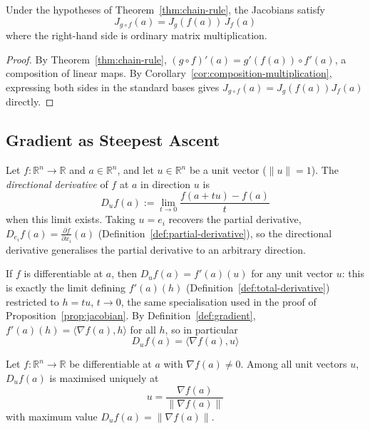 		\begin{corollary}
			\label{cor:chain-rule-matrix}
			Under the hypotheses of Theorem~\ref{thm:chain-rule}, the Jacobians satisfy
			\[
				J_{g\circ f}(a) = J_g(f(a))\, J_f(a)
			\]
			where the right-hand side is ordinary matrix multiplication.
		\end{corollary}
		
		\begin{proof}
			By Theorem~\ref{thm:chain-rule}, $(g\circ f)'(a) = g'(f(a))\circ f'(a)$, a composition of linear maps. By Corollary~\ref{cor:composition-multiplication}, expressing both sides in the standard bases gives $J_{g\circ f}(a) = J_g(f(a))J_f(a)$ directly.
		\end{proof}
		
	\subsection{Gradient as Steepest Ascent}
		
		\begin{definition}
			\label{def:directional-derivative}
			Let $f:\mathbb{R}^n\to\mathbb{R}$ and $a\in\mathbb{R}^n$, and let $u\in\mathbb{R}^n$ be a unit vector ($\|u\|=1$). The \emph{directional derivative} of $f$ at $a$ in direction $u$ is
			\[
				D_uf(a) := \lim_{t\to0} \frac{f(a+tu)-f(a)}{t}
			\]
			when this limit exists. Taking $u=e_i$ recovers the partial derivative, $D_{e_i}f(a) = \frac{\partial f}{\partial x_i}(a)$ (Definition~\ref{def:partial-derivative}), so the directional derivative generalises the partial derivative to an arbitrary direction.
		\end{definition}
		
		\begin{remark}
			\label{rem:directional-derivative-gradient}
			If $f$ is differentiable at $a$, then $D_uf(a) = f'(a)(u)$ for any unit vector $u$: this is exactly the limit defining $f'(a)(h)$ (Definition~\ref{def:total-derivative}) restricted to $h=tu$, $t\to0$, the same specialisation used in the proof of Proposition~\ref{prop:jacobian}. By Definition~\ref{def:gradient}, $f'(a)(h) = \langle \nabla f(a), h\rangle$ for all $h$, so in particular
			\[
				D_uf(a) = \langle \nabla f(a), u \rangle
			\]
		\end{remark}
		
		\begin{theorem}
			\label{thm:steepest-ascent}
			Let $f:\mathbb{R}^n\to\mathbb{R}$ be differentiable at $a$ with $\nabla f(a)\neq0$. Among all unit vectors $u$, $D_uf(a)$ is maximised uniquely at
			\[
				u = \frac{\nabla f(a)}{\|\nabla f(a)\|}
			\]
			with maximum value $D_uf(a) = \|\nabla f(a)\|$.
		\end{theorem}
		
